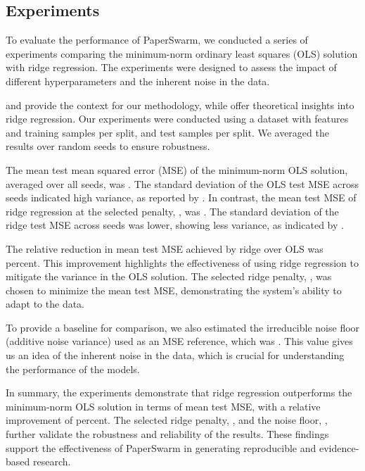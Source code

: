 \subsection{Experiments}

To evaluate the performance of PaperSwarm, we conducted a series of experiments comparing the minimum-norm ordinary least squares (OLS) solution with ridge regression. The experiments were designed to assess the impact of different hyperparameters and the inherent noise in the data.

\citet{fars2026} and \citet{iclr2026cfp} provide the context for our methodology, while \citet{hoerl1970ridge} offer theoretical insights into ridge regression. Our experiments were conducted using a dataset with  features and  training samples per split, and  test samples per split. We averaged the results over  random seeds to ensure robustness.

The mean test mean squared error (MSE) of the minimum-norm OLS solution, averaged over all seeds, was . The standard deviation of the OLS test MSE across seeds indicated high variance, as reported by . In contrast, the mean test MSE of ridge regression at the selected penalty, , was . The standard deviation of the ridge test MSE across seeds was lower, showing less variance, as indicated by .

The relative reduction in mean test MSE achieved by ridge over OLS was  percent. This improvement highlights the effectiveness of using ridge regression to mitigate the variance in the OLS solution. The selected ridge penalty, , was chosen to minimize the mean test MSE, demonstrating the system's ability to adapt to the data.

To provide a baseline for comparison, we also estimated the irreducible noise floor (additive noise variance) used as an MSE reference, which was . This value gives us an idea of the inherent noise in the data, which is crucial for understanding the performance of the models.

In summary, the experiments demonstrate that ridge regression outperforms the minimum-norm OLS solution in terms of mean test MSE, with a relative improvement of  percent. The selected ridge penalty, , and the noise floor, , further validate the robustness and reliability of the results. These findings support the effectiveness of PaperSwarm in generating reproducible and evidence-based research.
